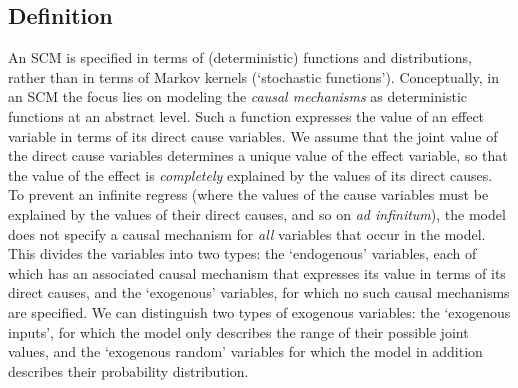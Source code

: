 \subsection{Definition}

An SCM is specified in terms of (deterministic) functions and distributions, rather than in terms of Markov kernels (`stochastic functions').
Conceptually, in an SCM the focus lies on modeling the \emph{causal mechanisms} as deterministic functions at an abstract level.
Such a function expresses the value of an effect variable in terms of its direct cause variables. 
We assume that the joint value of the direct cause variables determines a unique value of the effect variable,
so that the value of the effect is \emph{completely} explained by the values of its direct causes.
To prevent an infinite regress (where the values of the cause variables must be explained by the values of their direct causes, and so on \emph{ad infinitum}), the model does not specify a causal mechanism for \emph{all} variables that occur in the model.
This divides the variables into two types: the `endogenous' variables, each of which has an associated causal mechanism that expresses its value in terms of its direct causes, and the `exogenous' variables, for which no such causal mechanisms are specified.
We can distinguish two types of exogenous variables:
the `exogenous inputs', for which the model only describes the range of their possible joint values, and the `exogenous random' variables for which the model in addition describes their probability distribution.

